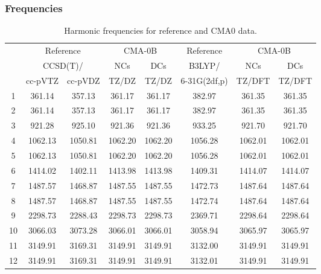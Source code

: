 \documentclass[10pt,oneside]{article}
\begin{document}
\clearpage

\subsubsection*{Frequencies}
\begin{table}[h!]
\centering
\caption{Harmonic frequencies for reference and CMA0 data.}
\begin{tabular}{cccccccc}
\toprule
{} & \multicolumn{2}{c}{Reference} & \multicolumn{2}{c}{CMA-0B} &    Reference & \multicolumn{2}{c}{CMA-0B} \\
{} & \multicolumn{2}{c}{CCSD(T)/} &     NCs &     DCs &       B3LYP/ &     NCs &     DCs \\
{} &   cc-pVTZ & cc-pVDZ &   TZ/DZ &   TZ/DZ & 6-31G(2df,p) &  TZ/DFT &  TZ/DFT \\
\midrule
1  &    361.14 &  357.13 &  361.17 &  361.17 &       382.97 &  361.35 &  361.35 \\
2  &    361.14 &  357.13 &  361.17 &  361.17 &       382.97 &  361.35 &  361.35 \\
3  &    921.28 &  925.10 &  921.36 &  921.36 &       933.25 &  921.70 &  921.70 \\
4  &   1062.13 & 1050.81 & 1062.20 & 1062.20 &      1056.28 & 1062.01 & 1062.01 \\
5  &   1062.13 & 1050.81 & 1062.20 & 1062.20 &      1056.28 & 1062.01 & 1062.01 \\
6  &   1414.02 & 1402.11 & 1413.98 & 1413.98 &      1409.31 & 1414.07 & 1414.07 \\
7  &   1487.57 & 1468.87 & 1487.55 & 1487.55 &      1472.73 & 1487.64 & 1487.64 \\
8  &   1487.57 & 1468.87 & 1487.55 & 1487.55 &      1472.74 & 1487.64 & 1487.64 \\
9  &   2298.73 & 2288.43 & 2298.73 & 2298.73 &      2369.71 & 2298.64 & 2298.64 \\
10 &   3066.03 & 3073.28 & 3066.01 & 3066.01 &      3058.94 & 3065.97 & 3065.97 \\
11 &   3149.91 & 3169.31 & 3149.91 & 3149.91 &      3132.00 & 3149.91 & 3149.91 \\
12 &   3149.91 & 3169.31 & 3149.91 & 3149.91 &      3132.01 & 3149.91 & 3149.91 \\
\bottomrule
\end{tabular}
\end{table}

\clearpage
\end{document}
